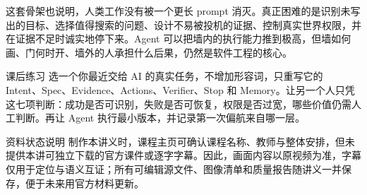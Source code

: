 \documentclass[a4paper,11pt]{article}
\begin{document}
这套骨架也说明，人类工作没有被一个更长 prompt 消灭。真正困难的是识别未写出的目标、选择值得搜索的问题、设计不易被投机的证据、控制真实世界权限，并在证据不足时诚实地停下来。Agent 可以把墙内的执行能力推到极高，但墙如何画、门何时开、墙外的人承担什么后果，仍然是软件工程的核心。

\begin{practicebox}{课后练习}
选一个你最近交给 AI 的真实任务，不增加形容词，只重写它的 Intent、Spec、Evidence、Actions、Verifier、Stop 和 Memory。让另一个人只凭这七项判断：成功是否可识别，失败是否可恢复，权限是否过宽，哪些价值仍需人工判断。再让 Agent 执行最小版本，并记录第一次偏航来自哪一层。
\end{practicebox}

\begin{boundarybox}{资料状态说明}
制作本讲义时，课程主页可确认课程名称、教师与整体安排，但未提供本讲可独立下载的官方课件或逐字字幕。因此，画面内容以原视频为准，字幕仅用于定位与语义互证；所有可编辑源文件、图像清单和质量报告随讲义一并保存，便于未来用官方材料更新。
\end{boundarybox}
\end{document}
